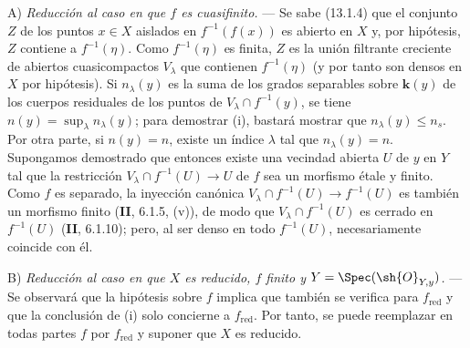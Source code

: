 A) \emph{Reducción al caso en que $f$ es cuasifinito.} --- Se sabe (13.1.4) que el conjunto $Z$ de los puntos $x\in X$ aislados en $f^{-1}(f(x))$ es abierto en $X$ y, por hipótesis, $Z$ contiene a $f^{-1}(\eta)$. Como $f^{-1}(\eta)$ es finita, $Z$ es la unión filtrante creciente de abiertos cuasicompactos $V_\lambda$ que contienen $f^{-1}(\eta)$ (y por tanto son densos en $X$ por hipótesis). Si $n_\lambda(y)$ es la suma de los grados separables sobre $\boldsymbol{k}(y)$ de los cuerpos residuales de los puntos de $V_\lambda\cap f^{-1}(y)$, se tiene $n(y)=\sup_\lambda n_\lambda(y)$; para demostrar (i), bastará mostrar que $n_\lambda(y)\leq n_s$. Por otra parte, si $n(y)=n$, existe un índice $\lambda$ tal que $n_\lambda(y)=n$. Supongamos demostrado que entonces existe una vecindad abierta $U$ de $y$ en $Y$ tal que la restricción $V_\lambda\cap f^{-1}(U)\to U$ de $f$ sea un morfismo étale y finito. Como $f$ es separado, la inyección canónica $V_\lambda\cap f^{-1}(U)\to f^{-1}(U)$ es también un morfismo finito (\textbf{II}, 6.1.5, (v)), de modo que $V_\lambda\cap f^{-1}(U)$ es cerrado en $f^{-1}(U)$ (\textbf{II}, 6.1.10); pero, al ser denso en todo $f^{-1}(U)$, necesariamente coincide con él.

B) \emph{Reducción al caso en que $X$ es reducido, $f$ finito y $Y=\Spec(\sh{O}_{Y,y})$.} --- Se observará que la hipótesis sobre $f$ implica que también se verifica para $f_{\mathrm{red}}$ y que la conclusión de (i) solo concierne a $f_{\mathrm{red}}$. Por tanto, se puede reemplazar en todas partes $f$ por $f_{\mathrm{red}}$ y suponer que $X$ es reducido.


